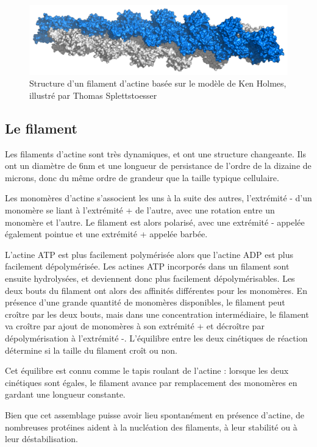 \begin{figure}
\includegraphics[scale=0.3]{Actin_filament_atomic_model.png}
\caption{Structure d'un filament d'actine basée sur le modèle de Ken Holmes, illustré par Thomas Splettstoesser}
\end{figure}

\subsection{Le filament}

Les filaments d'actine sont très dynamiques, et ont une structure changeante. Ils ont un diamètre de 6nm et une longueur de persistance de l'ordre de la dizaine de microns, donc du même ordre de grandeur que la taille typique cellulaire. 

Les monomères d'actine s'associent les uns à la suite des autres, l'extrémité - d'un monomère se liant à l'extrémité + de l'autre, avec une rotation entre un monomère et l'autre. 
Le filament est alors polarisé, avec une extrémité - appelée également pointue et une extrémité + appelée barbée. 

L'actine ATP est plus facilement polymérisée alors que l'actine ADP est plus facilement dépolymérisée. 
Les actines ATP incorporés dans un filament sont ensuite hydrolysées, et deviennent donc plus facilement dépolymérisables.
Les deux bouts du filament ont alors des affinités différentes pour les monomères. En présence d'une grande quantité de monomères disponibles, le filament peut croître par les deux bouts, mais dans une concentration intermédiaire, le filament va croître par ajout de monomères à son extrémité + et décroître par dépolymérisation à l'extrémité -. L'équilibre entre les deux cinétiques de réaction détermine si la taille du filament croît ou non. 

Cet équilibre est connu comme le \og tapis roulant \fg de l'actine : lorsque les deux cinétiques sont égales, le filament avance par remplacement des monomères en gardant une longueur constante. 

Bien que cet assemblage puisse avoir lieu spontanément en présence d'actine, de nombreuses protéines aident à la nucléation des filaments, à leur stabilité ou à leur déstabilisation. 

